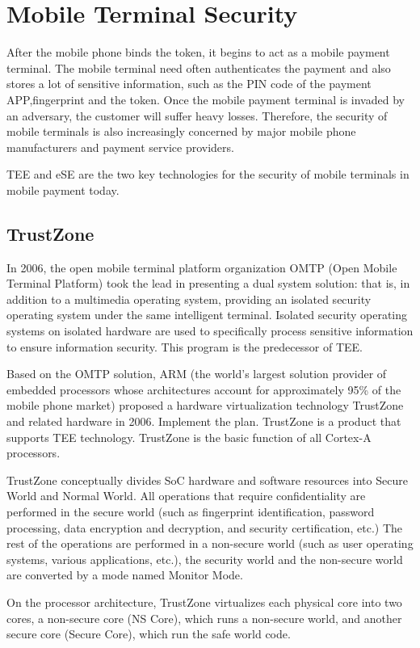 \documentclass[journal]{IEEEtran}
\begin{document}
\section{Mobile Terminal Security}
After the mobile phone binds the token, it begins to act as a mobile payment terminal. The mobile terminal need often authenticates the payment and also stores a lot of sensitive information, such as the PIN code of the payment APP,fingerprint and the token. Once the mobile payment terminal is invaded by an adversary, the customer will suffer heavy losses. Therefore, the security of mobile terminals is also increasingly concerned by major mobile phone manufacturers and payment service providers.

TEE and eSE are the two key technologies for the security of mobile terminals in mobile payment today.


\subsection{TrustZone}
In 2006, the open mobile terminal platform organization OMTP (Open Mobile Terminal Platform) took the lead in presenting a dual system solution: that is, in addition to a multimedia operating system, providing an isolated security operating system under the same intelligent terminal. Isolated security operating systems on isolated hardware are used to specifically process sensitive information to ensure information security. This program is the predecessor of TEE.

Based on the OMTP solution, ARM (the world's largest solution provider of embedded processors whose architectures account for approximately 95\% of the mobile phone market) proposed a hardware virtualization technology TrustZone and related hardware in 2006. Implement the plan. TrustZone is a product that supports TEE technology. TrustZone is the basic function of all Cortex-A processors. 

TrustZone conceptually divides SoC hardware and software resources into Secure World and Normal World. All operations that require confidentiality are performed in the secure world (such as fingerprint identification, password processing, data encryption and decryption, and security certification, etc.) The rest of the operations are performed in a non-secure world (such as user operating systems, various applications, etc.), the security world and the non-secure world are converted by a mode named Monitor Mode.

On the processor architecture, TrustZone virtualizes each physical core into two cores, a non-secure core (NS Core), which runs a non-secure world, and another secure core (Secure Core), which run the safe world code.
\end{document}
